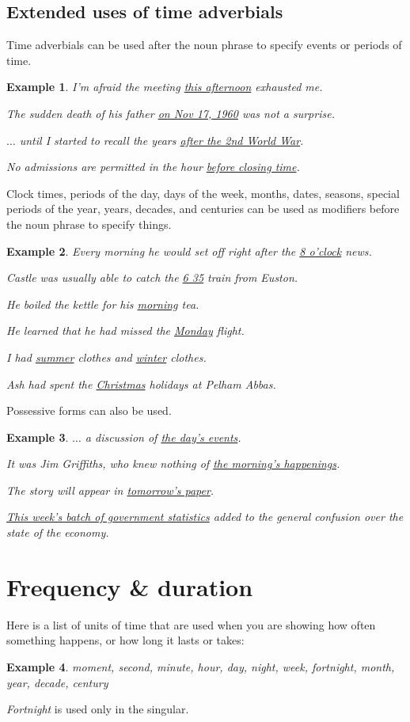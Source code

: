 \documentclass[oneside]{book}
\numberwithin{equation}{section}
\newtheorem{example}{Example}[section]
\begin{document}
\subsection{Extended uses of time adverbials}
\noindent{} Time adverbials can be used after the noun phrase to specify events or periods of time.
\begin{example}
    I'm afraid the meeting \underline{this afternoon} exhausted me.
    
    The sudden death of his father \underline{on Nov 17, 1960} was not a surprise.
    
    $\ldots$ until I started to recall the years \underline{after the 2nd World War}.
    
    No admissions are permitted in the hour \underline{before closing time}.
\end{example}
Clock times, periods of the day, days of the week, months, dates, seasons, special periods of the year, years, decades, and centuries can be used as modifiers before the noun phrase to specify things.
\begin{example}
    Every morning he would set off right after the \underline{8 o'clock} news.
    
    Castle was usually able to catch the \underline{6 35} train from Euston.
    
    He boiled the kettle for his \underline{morning} tea.
    
    He learned that he had missed the \underline{Monday} flight.
    
    I had \underline{summer} clothes and \underline{winter} clothes.
    
    Ash had spent the \underline{Christmas} holidays at Pelham Abbas.
\end{example}
Possessive forms can also be used.
\begin{example}
    $\ldots$ a discussion of \underline{the day's events}.
    
    It was Jim Griffiths, who knew nothing of \underline{the morning's happenings}.
    
    The story will appear in \underline{tomorrow's paper}.
    
    \underline{This week's batch of government statistics} added to the general confusion over the state of the economy.
\end{example}

\section{Frequency \& duration}
\noindent{} Here is a list of units of time that are used when you are showing how often something happens, or how long it lasts or takes:
\begin{example}
    moment, second, minute, hour, day, night, week,  fortnight, month, year, decade, century
\end{example}
\textit{Fortnight} is used only in the singular.
\end{document}
